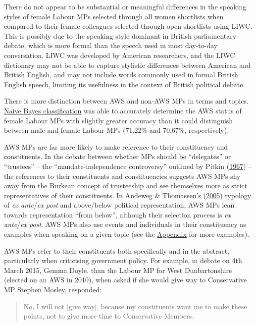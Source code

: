 \documentclass[]{article}
\begin{document}
There do not appear to be substantial or meaningful differences in the
speaking styles of female Labour MPs selected through all women
shortlists when compared to their female colleagues selected through
open shortlists using LIWC. This is possibly due to the speaking style
dominant in British parliamentary debate, which is more formal than the
speech used in most day-to-day conversation. LIWC was developed by
American researchers, and the LIWC dictionary may not be able to capture
stylistic differences between American and British English, and may not
include words commonly used in formal British English speech, limiting
its usefulness in the context of British political debate.

There is more distinction between AWS and non-AWS MPs in terms and
topics.
\protect\hyperlink{ux5cux2520Naiveux5cux2520Bayesux5cux2520classification}{Naive
Bayes classification} was able to accurately determine the AWS status of
female Labour MPs with slightly greater accuracy than it could
distinguish between male and female Labour MPs (71.22\% and 70.67\%,
respectively).

AWS MPs are far more likely to make reference to their constituency and
constituents. In the debate between whether MPs should be ``delegates''
or ``trustees'' -- the ``mandate-independence controversy'' outlined by
Pitkin (\protect\hyperlink{ref-pitkin1967}{1967}) -- the references to
their constituents and constituencies suggests AWS MPs shy away from the
Burkean concept of trusteeship and see themselves more as strict
representatives of their constituents. In Andeweg \& Thomassen's
(\protect\hyperlink{ref-andeweg2005}{2005}) typology of \emph{ex
ante}/\emph{ex post} and above/below political representation, AWS MPs
lean towards representation ``from below'', although their selection
process is \emph{ex ante}/\emph{ex post}. AWS MPs also use events and
individuals in their constituency as examples when speaking on a given
topic (see the
\protect\hyperlink{ux5cux2520AWSux5cux2520Referencesux5cux2520toux5cux2520Constituentsux5cux2520inux5cux2520Context}{Appendix}
for more examples).

AWS MPs refer to their constituents both specifically and in the
abstract, particularly when criticising government policy. For example,
in debate on 4th March 2015, Gemma Doyle, than the Labour MP for West
Dunbartonshire (elected on an AWS in 2010), when asked if she would give
way to Conservative MP Stephen Mosley, responded:

\begin{quote}
No, I will not {[}give way{]}, because my constituents want me to make
these points, not to give more time to Conservative Members.
\end{quote}
\end{document}
